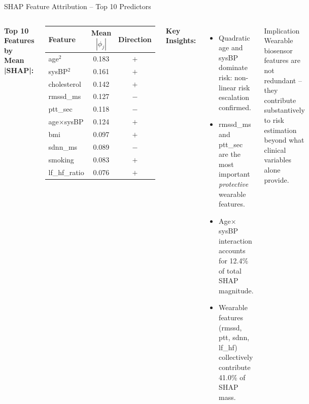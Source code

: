 \documentclass[aspectratio=169]{beamer}
\begin{document}
\begin{frame}{SHAP Feature Attribution -- Top 10 Predictors}
  \begin{columns}[T]
      \textbf{Top 10 Features by Mean |SHAP|:}
      \begin{center}\small
      \begin{tabular}{@{}lcc@{}}
        \toprule
        \textbf{Feature} & \textbf{Mean $|\phi_j|$} & \textbf{Direction} \\
        \midrule
        age$^2$           & 0.183 & $+$ \\
        sysBP$^2$         & 0.161 & $+$ \\
        cholesterol       & 0.142 & $+$ \\
        rmssd\_ms         & 0.127 & $-$ \\
        ptt\_sec          & 0.118 & $-$ \\
        age$\times$sysBP  & 0.124 & $+$ \\
        bmi               & 0.097 & $+$ \\
        sdnn\_ms          & 0.089 & $-$ \\
        smoking           & 0.083 & $+$ \\
        lf\_hf\_ratio     & 0.076 & $+$ \\
        \bottomrule
      \end{tabular}
      \end{center}
      \textbf{Key Insights:}
      \begin{itemize}\small
        \item Quadratic age and sysBP dominate risk:
              non-linear risk escalation confirmed.
        \item rmssd\_ms and ptt\_sec are the most
              important \emph{protective} wearable features.
        \item Age$\times$sysBP interaction accounts for
              12.4\% of total SHAP magnitude.
        \item Wearable features (rmssd, ptt, sdnn, lf\_hf)
              collectively contribute 41.0\% of SHAP mass.
      \end{itemize}
      \begin{block}{Implication}
        Wearable biosensor features are not redundant --
        they contribute substantively to risk estimation
        beyond what clinical variables alone provide.
      \end{block}
  \end{columns}
\end{frame}
\end{document}
